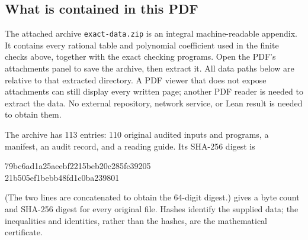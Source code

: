 \documentclass[11pt,a4paper]{article}
\begin{document}
\subsection{What is contained in this PDF}
The attached archive \texttt{exact-data.zip} is an integral machine-readable
appendix. It contains every rational table and polynomial coefficient used
in the finite checks above, together with the exact checking programs.
Open the PDF's attachments panel to save the archive, then extract it.
All data paths below are relative to that extracted directory. A PDF
viewer that does not expose attachments can still display every written
page; another PDF reader is needed to extract the data. No external
repository, network service, or Lean result is needed to obtain them.

The archive has 113 entries: 110 original audited inputs and programs,
a manifest, an audit record, and a reading guide. Its SHA-256 digest is
\begin{center}\small\ttfamily
79bc6ad1a25aeebf2215beb20c285fc39205\\
21b505ef1bebb48fd1c0ba239801
\end{center}
(The two lines are concatenated to obtain the 64-digit digest.)
 gives a byte count and SHA-256 digest for every
original file. Hashes identify the supplied data; the inequalities and
identities, rather than the hashes, are the mathematical certificate.
\end{document}
